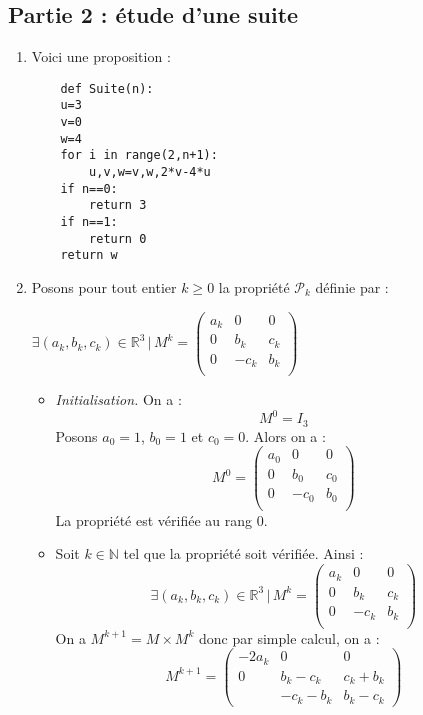 \documentclass[a4paper,twoside,french,10pt]{VcCours}
\begin{document}
\subsection*{Partie 2 : étude d'une suite}
\begin{enumerate}
    \item Voici une proposition :
    \begin{verbatim}
    def Suite(n):
    u=3
    v=0
    w=4
    for i in range(2,n+1):
        u,v,w=v,w,2*v-4*u
    if n==0:
        return 3
    if n==1:
        return 0
    return w
    \end{verbatim}
    \item Posons pour tout entier $k \geq 0$ la propriété $\mathcal{P}_k$ définie par :
    
    \begin{center}
    \og $\exists (a_k,b_k,c_k) \in \mathbb{R}^3 \, \vert \,  M^k = \begin{pmatrix}
    a_k & 0 & 0 \\
    0 & b_k & c_k \\
    0 & -c_k & b_k \\
    \end{pmatrix}$ \fg
    \end{center}
    \begin{itemize}
    \item \textit{Initialisation.} On a :
    $$ M^0 = I_3$$
    Posons $a_0=1$, $b_0=1$ et $c_0=0$. Alors on a :
    $$ M^0 = \begin{pmatrix}
    a_0 & 0 & 0 \\
    0 & b_0 & c_0 \\
    0 & -c_0 & b_0 \\
    \end{pmatrix}$$
    La propriété est vérifiée au rang $0$.
    \item Soit $k \in \mathbb{N}$ tel que la propriété soit vérifiée. Ainsi :
    $$ \exists (a_k,b_k,c_k) \in \mathbb{R}^3 \, \vert \,  M^k = \begin{pmatrix}
    a_k & 0 & 0 \\
    0 & b_k & c_k \\
    0 & -c_k & b_k \\
    \end{pmatrix}$$
    On a $M^{k+1}= M \times M^k$ donc par simple calcul, on a :
    $$ M^{k+1} = \begin{pmatrix}
    -2a_k & 0 & 0 \\
    0 & b_k-c_k & c_k+b_k \\
    & -c_k -b_k & b_k-c_k

\end{pmatrix}$$
\end{itemize}
\end{enumerate}
\end{document}
